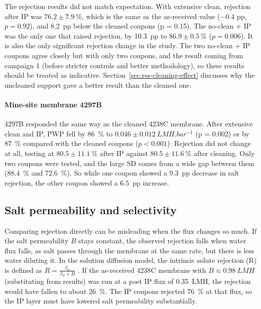 The rejection results did not match expectation. With extensive clean, rejection after IP was $76.2 \pm \qty{7.9}{\percent}$, which is the same as the as-received value ($-0.4$ pp, $p =0.92$), and \qty{8.2}{pp} below the cleaned coupons (p = 0.15). The no-clean + IP was the only one that raised rejection, by \qty{10.3}{pp} to $86.9 \pm \qty{0.5}{\percent}$ ($p = 0.006$). It is also the only significant rejection change in the study. The two no-clean + IP coupons agree closely but with only two coupons, and the result coming from campaign 1 (before stricter controls and better methodology), so these results should be treated as indicative.  Section~\ref{sec:res-cleaning-effect} discusses why the uncleaned support gave a better result than the cleaned one. 

\paragraph{Mine-site membrane 4297B}
4297B responded the same way as the cleaned 4238C membrane. After extensive clean and IP, PWP fell by \qty{86}{\percent} to $0.046 \pm \qty{0.012}{LMH.bar^{-1}}$ (p = 0.002) or by \qty{87}{\percent} compared with the cleaned coupons ($p < 0.001$). Rejection did not change at all, testing at $80.5 \pm \qty{11.1}{\percent}$ after IP against $80.5 \pm \qty{11.6}{\percent}$ after cleaning. Only two coupons were tested, and the large SD comes from a wide gap between them (\qty{88.4}{\percent} and \qty{72.6}{\percent}). So while one coupon showed a  \qty{9.3}{pp} decrease in salt rejection, the other coupon showed a \qty{6.5}{pp} increase. 

\subsection{Salt permeability and selectivity}
\label{sec:res-ip-B}
Comparing rejection directly can be misleading when the flux changes so much. If the salt permeability $B$ stays constant, the observed rejection falls when water flux falls, as salt passes through the membrane at the same rate, but there is less water diluting it. In the solution diffusion model, the intrinsic solute rejection (R) is defined as $R = \frac{J_w}{J_w + B}$ . If the as-received 4238C membrane with $B \approx \qty{0.98}{LMH}$ (substituting from results) was run at a post IP flux of \qty{0.35}{LMH}, the rejection would have fallen to about \qty{26}{\percent}. The IP coupons rejected \qty{76}{\percent} at that flux, so the IP layer must have lowered salt permeability substantially. 

